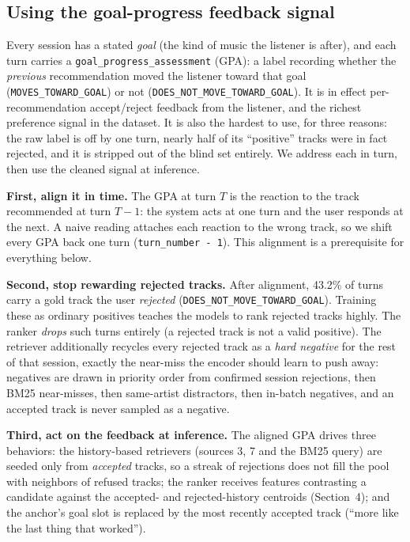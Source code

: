 \documentclass[sigconf]{acmart}
\begin{document}
\subsection{Using the goal-progress feedback signal}

Every session has a stated \emph{goal} (the kind of music the listener is after),
and each turn carries a \texttt{goal\_progress\_assessment} (GPA): a label recording
whether the \emph{previous} recommendation moved the listener toward that goal
(\texttt{MOVES\_TOWARD\_GOAL}) or not (\texttt{DOES\_NOT\_MOVE\_TOWARD\_GOAL}). It is
in effect per-recommendation accept/reject feedback from the listener, and the
richest preference signal in the dataset. It is also the hardest to use, for three
reasons: the raw label is off by one turn, nearly half of its ``positive'' tracks
were in fact rejected, and it is stripped out of the blind set entirely. We address
each in turn, then use the cleaned signal at inference.

\textbf{First, align it in time.} The GPA at turn $T$ is the reaction to the track
recommended at turn $T{-}1$: the system acts at one turn and the user responds at the
next. A naive reading attaches each reaction to the wrong track, so we shift every
GPA back one turn (\texttt{turn\_number - 1}). This alignment is a prerequisite for
everything below.

\textbf{Second, stop rewarding rejected tracks.} After alignment, 43.2\% of turns
carry a gold track the user \emph{rejected} (\texttt{DOES\_NOT\_MOVE\_TOWARD\_GOAL}). Training
these as ordinary positives teaches the models to rank rejected tracks highly.
The ranker \emph{drops} such turns entirely (a rejected track is not a valid
positive). The retriever additionally recycles every rejected track as a \emph{hard
negative} for the rest of that session, exactly the near-miss the encoder
should learn to push away: negatives are drawn in priority order from confirmed
session rejections, then BM25 near-misses, then same-artist distractors, then
in-batch negatives, and an accepted track is never sampled as a negative.

\textbf{Third, act on the feedback at inference.} The aligned GPA drives three
behaviors: the history-based retrievers (sources 3, 7 and the BM25 query) are
seeded only from \emph{accepted} tracks, so a streak of rejections does not fill the
pool with neighbors of refused tracks; the ranker receives features contrasting a
candidate against the accepted- and rejected-history centroids (Section~4); and
the anchor's goal slot is replaced by the most recently accepted track (``more like
the last thing that worked'').
\end{document}
